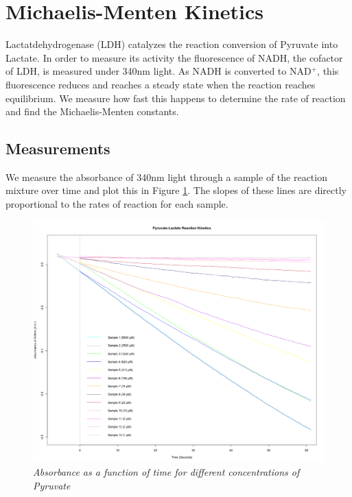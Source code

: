 \documentclass[a4paper,10pt]{article}
\begin{document}
    \section{Michaelis-Menten Kinetics}
        Lactatdehydrogenase (LDH) catalyzes the reaction conversion of Pyruvate into Lactate. 
        In order to measure its activity the fluorescence of NADH, the cofactor of LDH, is measured 
        under 340nm light. As NADH is converted to NAD$^+$, this fluorescence reduces and reaches a 
        steady state when the reaction reaches equilibrium. We measure how fast this happens to determine
        the rate of reaction and find the Michaelis-Menten constants.
        
        \subsection*{Measurements}
            We measure the absorbance of 340nm light through a sample of the reaction mixture over time
            and plot this in Figure \ref{fig:mm_rates}. The slopes of these lines are directly proportional
            to the rates of reaction for each sample.
            \begin{figure}[H]
                \centering
                \includegraphics[width=430px]{../resources/kinetics_rates.png}
                \caption{\it Absorbance  as a function of time for different concentrations of Pyruvate}\label{fig:mm_rates}
            \end{figure}
            
\end{document}
